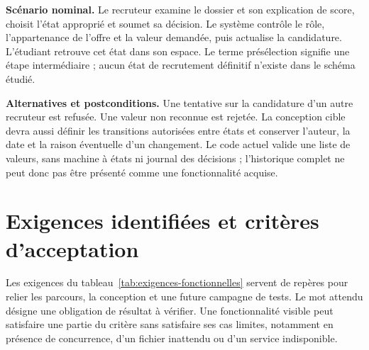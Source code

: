\textbf{Scénario nominal.} Le recruteur examine le dossier et son explication de score, choisit l'état approprié et soumet sa décision. Le système contrôle le rôle, l'appartenance de l'offre et la valeur demandée, puis actualise la candidature. L'étudiant retrouve cet état dans son espace. Le terme présélection signifie une étape intermédiaire ; aucun état de recrutement définitif n'existe dans le schéma étudié.

\textbf{Alternatives et postconditions.} Une tentative sur la candidature d'un autre recruteur est refusée. Une valeur non reconnue est rejetée. La conception cible devra aussi définir les transitions autorisées entre états et conserver l'auteur, la date et la raison éventuelle d'un changement. Le code actuel valide une liste de valeurs, sans machine à états ni journal des décisions ; l'historique complet ne peut donc pas être présenté comme une fonctionnalité acquise.

\section{Exigences identifiées et critères d'acceptation}

Les exigences du tableau~\ref{tab:exigences-fonctionnelles} servent de repères pour relier les parcours, la conception et une future campagne de tests. Le mot attendu désigne une obligation de résultat à vérifier. Une fonctionnalité visible peut satisfaire une partie du critère sans satisfaire ses cas limites, notamment en présence de concurrence, d'un fichier inattendu ou d'un service indisponible.

